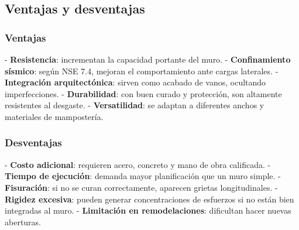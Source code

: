 \documentclass[12pt]{article}
\begin{document}
	\subsection{Ventajas y desventajas}
	
	\subsubsection{Ventajas}
	- \textbf{Resistencia}: incrementan la capacidad portante del muro.  
	- \textbf{Confinamiento sísmico}: según NSE 7.4, mejoran el comportamiento ante cargas laterales.  
	- \textbf{Integración arquitectónica}: sirven como acabado de vanos, ocultando imperfecciones.  
	- \textbf{Durabilidad}: con buen curado y protección, son altamente resistentes al desgaste.  
	- \textbf{Versatilidad}: se adaptan a diferentes anchos y materiales de mampostería.  
	
	\subsubsection{Desventajas}
	- \textbf{Costo adicional}: requieren acero, concreto y mano de obra calificada.  
	- \textbf{Tiempo de ejecución}: demanda mayor planificación que un muro simple.  
	- \textbf{Fisuración}: si no se curan correctamente, aparecen grietas longitudinales.  
	- \textbf{Rigidez excesiva}: pueden generar concentraciones de esfuerzos si no están bien integradas al muro.  
	- \textbf{Limitación en remodelaciones}: dificultan hacer nuevas aberturas.  
	
	  
	
	
	
	
			
\end{document}
